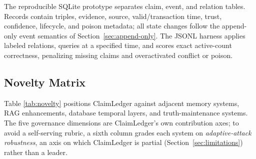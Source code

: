 The reproducible SQLite prototype separates claim, event, and relation tables. Records contain triples, evidence, source, valid/transaction time, trust, confidence, lifecycle, and poison metadata; all state changes follow the append-only event semantics of Section~\ref{sec:append-only}. The JSONL harness applies labeled relations, queries at a specified time, and scores exact active-count correctness, penalizing missing claims and overactivated conflict or poison.

\subsection{Novelty Matrix}\label{sec:novelty-matrix}

Table \ref{tab:novelty} positions ClaimLedger against adjacent memory systems, RAG enhancements, database temporal layers, and truth-maintenance systems. The five governance dimensions are ClaimLedger's own contribution axes; to avoid a self-serving rubric, a sixth column grades each system on \emph{adaptive-attack robustness}, an axis on which ClaimLedger is partial (Section~\ref{sec:limitations}) rather than a leader.

\begin{table}[!t]
\centering
\caption{Novelty matrix: ClaimLedger versus adjacent memory, RAG, temporal-database, and truth-maintenance systems. The first five dimensions are governance axes (ClaimLedger's contribution); the sixth, adaptive-attack robustness, is included so the comparison is not graded only on ClaimLedger's own axes. Y = provided, P = partial, N = absent. This is a governance-dimension comparison, not an overall ranking.}
%
\label{tab:novelty}
\end{table}


